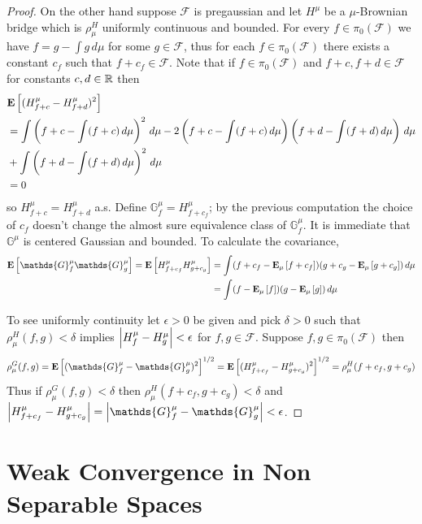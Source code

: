 \begin{proof}
On the other hand suppose $\mathcal{F}$ is pregaussian and let $H^\mu$ be a $\mu$-Brownian bridge which is $\rho^H_\mu$ uniformly continuous and bounded.  
For every $f \in \pi_0(\mathcal{F})$ we have $f = g - \int g \, d\mu$ for some $g \in \mathcal{F}$, thus for each $f \in \pi_0(\mathcal{F})$ there exists a constant
$c_f$ such that $f+c_f \in \mathcal{F}$.  Note that if $f \in \pi_0(\mathcal{F})$ and $f+c,f+d \in \mathcal{F}$ for constants $c,d \in \mathbb{R}$ then
\begin{align*}
&\textbf{E}\left[(H^\mu_{f+c} - H^\mu_{f+d})^2\right] \\
&= \int \left(f+c - \int(f+c) \, d\mu\right)^2 \, d\mu  -2 \left(f+c - \int(f+c) \, d\mu\right) \left(f+d - \int(f+d) \, d\mu\right)  \, d\mu \\
&+ \int \left(f+d - \int(f+d) \, d\mu\right)^2 \, d\mu  \\
&=0
\end{align*}
so $H^\mu_{f+c}=H^\mu_{f+d}$ a.s.
Define $\mathds{G}^\mu_f = H^\mu_{f+c_f}$; by the previous computation the choice of $c_f$ doesn't change the almost sure equivalence class of $\mathds{G}^\mu_f$.  It is immediate that $\mathds{G}^\mu$ is centered Gaussian and bounded.  To calculate the covariance,
\begin{align*}
\expectation{\mathds{G}^\mu_f \mathds{G}^\mu_g} = \expectation{H^\mu_{f+c_f}  H^\mu_{g+c_g}}  &= \int (f+c_f - \sexpectation{f+c_f}{\mu}) (g+c_g - \sexpectation{g+c_g}{\mu}) \, d\mu\\
&= \int (f- \sexpectation{f}{\mu}) (g - \sexpectation{g}{\mu}) \, d\mu
\end{align*}

To see uniformly continuity let $\epsilon > 0$ be given and pick $\delta > 0$ such that $\rho^H_\mu(f,g) < \delta$ implies $\left \vert H^\mu_f - H^\mu_g \right \vert<\epsilon$ for $f,g \in \mathcal{F}$.  Suppose $f,g \in \pi_0(\mathcal{F})$ then 
\begin{align*}
\rho^G_\mu(f,g) &= \expectation{(\mathds{G}^\mu_f - \mathds{G}^\mu_g)^2}^{1/2} = \expectation{(H^\mu_{f+c_f} - H^\mu_{g+c_g})^2}^{1/2} = \rho^H_\mu(f+c_f, g+c_g)\\
 \end{align*}
Thus if $\rho^G_\mu(f,g)<\delta$ then $\rho^H_\mu(f+c_f, g+c_g)<\delta$ and $\abs{H^\mu_{f+c_f} - H^\mu_{g+c_g}}=\abs{\mathds{G}^\mu_f - \mathds{G}^\mu_g}<\epsilon$.
\end{proof}

\section{Weak Convergence in Non Separable Spaces}

